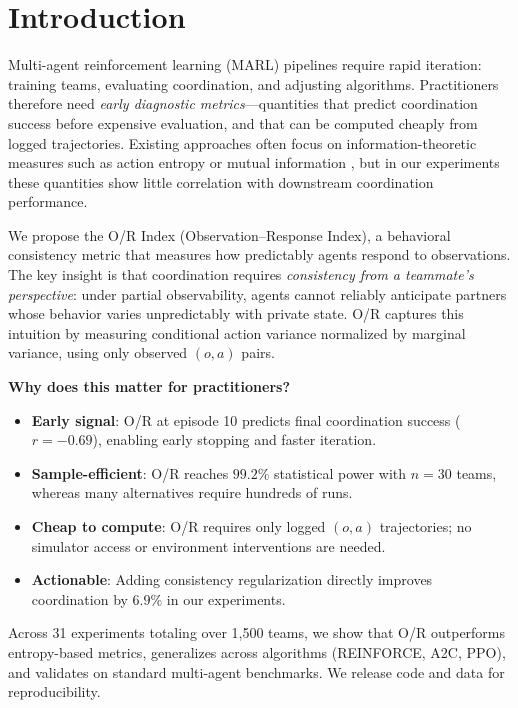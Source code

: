 \documentclass[twoside]{article}
\newcommand{\ORIndex}{O/R Index}
\theoremstyle{remark}
\begin{document}
\section{Introduction}

Multi-agent reinforcement learning (MARL) pipelines require rapid iteration:
training teams, evaluating coordination, and adjusting algorithms. Practitioners
therefore need \emph{early diagnostic metrics}—quantities that predict
coordination success before expensive evaluation, and that can be computed
cheaply from logged trajectories. Existing approaches often focus on
information-theoretic measures such as action entropy or mutual information
\citep{jaques2019social}, but in our experiments these quantities show little
correlation with downstream coordination performance.

We propose the \ORIndex{} (Observation--Response Index), a behavioral
consistency metric that measures how predictably agents respond to observations.
The key insight is that coordination requires \emph{consistency from a
teammate's perspective}: under partial observability, agents cannot reliably
anticipate partners whose behavior varies unpredictably with private state.
O/R captures this intuition by measuring conditional action variance normalized
by marginal variance, using only observed $(o, a)$ pairs.

\textbf{Why does this matter for practitioners?}
\begin{itemize}
    \item \textbf{Early signal}: O/R at episode 10 predicts final coordination
    success ($r = -0.69$), enabling early stopping and faster iteration.
    \item \textbf{Sample-efficient}: O/R reaches $99.2\%$ statistical power with
    $n = 30$ teams, whereas many alternatives require hundreds of runs.
    \item \textbf{Cheap to compute}: O/R requires only logged $(o, a)$
    trajectories; no simulator access or environment interventions are needed.
    \item \textbf{Actionable}: Adding consistency regularization directly
    improves coordination by $6.9\%$ in our experiments.
\end{itemize}

Across 31 experiments totaling over 1{,}500 teams, we show that O/R outperforms
entropy-based metrics, generalizes across algorithms (REINFORCE, A2C, PPO), and
validates on standard multi-agent benchmarks. We release code and data for
reproducibility.
\end{document}
